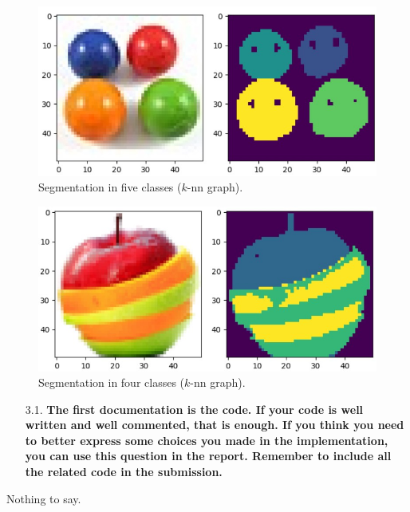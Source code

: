 \documentclass[a4paper, 11pt]{report}
\begin{document}
    \begin{figure}[!h]
        \centering
        \includegraphics[scale=0.65]{images/four_elements_segmentation.jpg}
        \caption{Segmentation in five classes ($k$-nn graph).}
        \label{fig:four-elements-segmentation}
    \end{figure}

    \begin{figure}[!h]
        \centering
        \includegraphics[scale=0.65]{images/fruit_salad_segmentation.jpg}
        \caption{Segmentation in four classes ($k$-nn graph).}
        \label{fig:fruit-salad-segmentation}
    \end{figure}


\begin{itemize}
    \item[3.1.] \textbf{The first documentation is the code. If your code is well written and well commented, that is enough. If you think you need to better express some choices you made in the implementation, you can use this question in the report. Remember to include all the related code in the submission.}
\end{itemize}
    
    Nothing to say.
    
\end{document}
